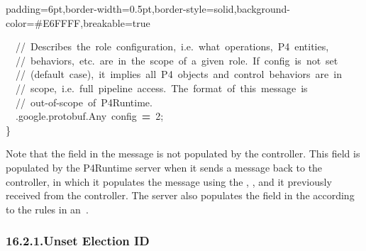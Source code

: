 \documentclass[11pt]{article}
\begin{document}
{\begin{mdbmargintb}{6pt}{6pt}
\begin{mdblock}{padding=6pt,border-width=0.5pt,border-style=solid,background-color=\#E6FFFF,breakable=true}
\begin{mdpre}
{{~~{//~Describes~the~role~configuration,~i.e.~what~operations,~P4~entities,}\\
~~{//~behaviors,~etc.~are~in~the~scope~of~a~given~role.~If~config~is~not~set}\\
~~{//~(default~case),~it~implies~all~P4~objects~and~control~behaviors~are~in}\\
~~{//~scope,~i.e.~full~pipeline~access.~The~format~of~this~message~is}\\
~~{//~out-of-scope~of~P4Runtime.}\\
~~.google.protobuf.Any~config~{\bfseries{=}}~{2};\\
\}}}%
\end{mdpre}%
\end{mdblock}%
\end{mdbmargintb}%

\noindent{}Note that the  field in the  message is not
populated by the controller. This field is populated by the P4Runtime server
when it sends a  message back to the controller, in which
it populates the  message using the ,
, and  it previously received from the controller. The server
also populates the  field in the  according to
the rules in an~.%

\subsubsection{16.2.1.\hspace*{0.5em}Unset Election ID}\label{sec-unset-election-id}%

}
\end{document}
